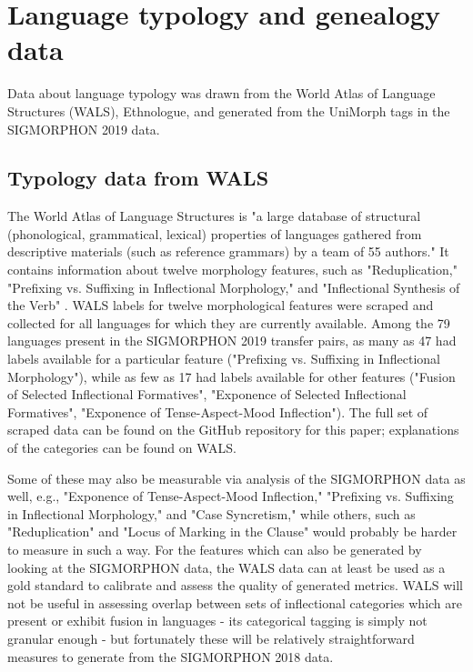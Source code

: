 \section{Language typology and genealogy data}

Data about language typology was drawn from the World Atlas of Language Structures (WALS), Ethnologue, and generated from the UniMorph tags in the SIGMORPHON 2019 data.

\subsection{Typology data from WALS}

The World Atlas of Language Structures is "a large database of structural (phonological, grammatical, lexical) properties of languages gathered from descriptive materials (such as reference grammars) by a team of 55 authors." It contains information about twelve morphology features, such as "Reduplication," "Prefixing vs. Suffixing in Inflectional Morphology," and "Inflectional Synthesis of the Verb" \parencite{WALS}. WALS labels for twelve morphological features were scraped and collected for all languages for which they are currently available. Among the 79 languages present in the SIGMORPHON 2019 transfer pairs, as many as 47 had labels available for a particular feature ("Prefixing vs. Suffixing in Inflectional Morphology"), while as few as 17 had labels available for other features ("Fusion of Selected Inflectional Formatives", "Exponence of Selected Inflectional Formatives", "Exponence of Tense-Aspect-Mood Inflection"). The full set of scraped data can be found on the GitHub repository for this paper; explanations of the categories can be found on WALS. 

Some of these may also be measurable via analysis of the SIGMORPHON data as well, e.g., "Exponence of Tense-Aspect-Mood Inflection," "Prefixing vs. Suffixing in Inflectional Morphology," and "Case Syncretism," while others, such as "Reduplication" and "Locus of Marking in the Clause" would probably be harder to measure in such a way. For the features which can also be generated by looking at the SIGMORPHON data, the WALS data can at least be used as a gold standard to calibrate and assess the quality of generated metrics. WALS will not be useful in assessing overlap between sets of inflectional categories which are present or exhibit fusion in languages - its categorical tagging is simply not granular enough - but fortunately these will be relatively straightforward measures to generate from the SIGMORPHON 2018 data.

